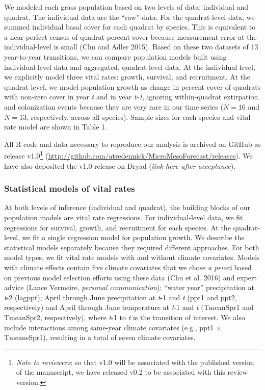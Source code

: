 \documentclass[12pt,]{article}
\let\rmarkdownfootnote\footnote%
\def\footnote{\protect\rmarkdownfootnote}
\begin{document}
We modeled each grass population based on two levels of data: individual
and quadrat. The individual data are the ``raw'' data. For the
quadrat-level data, we summed individual basal cover for each quadrat by
species. This is equivalent to a near-perfect census of quadrat percent
cover because measurement error at the individual-level is small (Chu
and Adler 2015). Based on these two datasets of 13 year-to-year
transitions, we can compare population models built using
individual-level data and aggregated, quadrat-level data. At the
individual level, we explicitly model three vital rates: growth,
survival, and recruitment. At the quadrat level, we model population
growth as change in percent cover of quadrats with non-zero cover in
year \emph{t} and in year \emph{t-1}, ignoring within-quadrat
extirpation and colonization events because they are very rare in our
time series (\(N=16\) and \(N=13\), respectively, across all species).
Sample sizes for each species and vital rate model are shown in Table 1.

All R code and data necessary to reproduce our analysis is archived on
GitHub as release v1.0\footnote{\emph{Note to reviewers}: so that v1.0
  will be associated with the published version of the manuscript, we
  have released v0.2 to be associated with this review version.}
(\url{http://github.com/atredennick/MicroMesoForecast/releases}). We
have also deposited the v1.0 release on Dryad (\emph{link here after
acceptance}).

\subsubsection{Statistical models of vital
rates}\label{statistical-models-of-vital-rates}

At both levels of inference (individual and quadrat), the building
blocks of our population models are vital rate regressions. For
individual-level data, we fit regressions for survival, growth, and
recruitment for each species. At the quadrat-level, we fit a single
regression model for population growth. We describe the statistical
models separately because they required different approaches. For both
model types, we fit vital rate models with and without climate
covariates. Models with climate effects contain five climate covariates
that we chose \emph{a priori} based on previous model selection efforts
using these data (Chu et al. 2016) and expert advice (Lance Vermeire,
\emph{personal communication}): ``water year'' precipitation at
\emph{t}-2 (lagppt); April through June precipitation at \emph{t}-1 and
\emph{t} (ppt1 and ppt2, respectively) and April through June
temperature at \emph{t}-1 and \emph{t} (TmeanSpr1 and TmeanSpr2,
respectively), where \emph{t}-1 to \emph{t} is the transition of
interest. We also include interactions among same-year climate
covariates (e.g., ppt1 \(\times\) TmeansSpr1), resulting in a total of
seven climate covariates.
\end{document}

